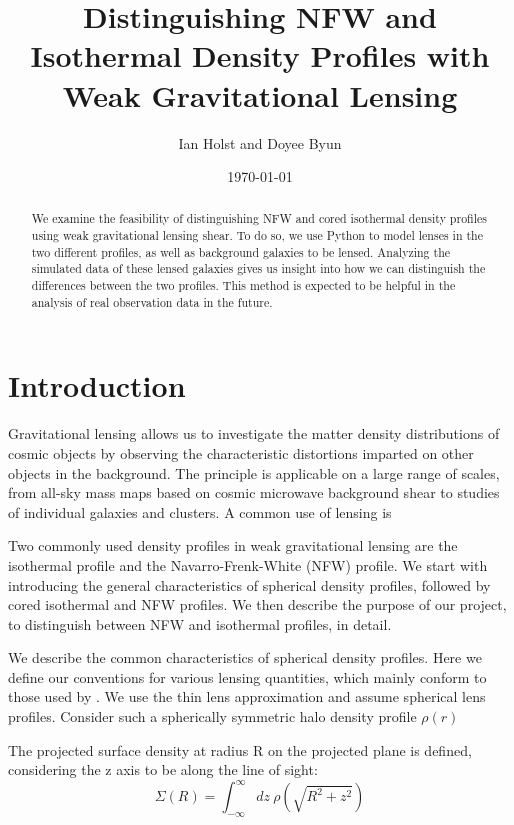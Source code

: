 \documentclass[10pt]{article}
\begin{document}
\title{Distinguishing NFW and Isothermal Density Profiles with Weak Gravitational Lensing}
\author{Ian Holst and Doyee Byun}
\date{\today}
\maketitle

\begin{abstract}
We examine the feasibility of distinguishing NFW and cored isothermal density profiles using weak gravitational lensing shear.
 To do so, we use Python to model lenses in the two different profiles, as well as background galaxies to be lensed.
 Analyzing the simulated data of these lensed galaxies gives us insight into how we can distinguish the differences between the two profiles.
 This method is expected to be helpful in the analysis of real observation data in the future.
\end{abstract}

\section{Introduction}
Gravitational lensing allows us to investigate the matter density distributions of cosmic objects by observing the characteristic distortions imparted on other objects in the background. The principle is applicable on a large range of scales, from all-sky mass maps based on cosmic microwave background shear to studies of individual galaxies and clusters.
A common use of lensing is

Two commonly used density profiles in weak gravitational lensing are the isothermal profile and the Navarro-Frenk-White (NFW) profile.
We start with introducing the general characteristics of spherical density profiles, followed by cored isothermal and NFW profiles.
We then describe the purpose of our project, to distinguish between NFW and isothermal profiles, in detail.


We describe the common characteristics of spherical density profiles.
Here we define our conventions for various lensing quantities, which mainly conform to those used by \citet{Dodelson2017}. We use the thin lens approximation and assume spherical lens profiles.
Consider such a spherically symmetric halo density profile $\rho(r)$

The projected surface density at radius R on the projected plane is defined, considering the z axis to be along the line of sight:
\begin{equation}
\Sigma(R) = \int_{-\infty}^{\infty}{dz\ \rho(\sqrt{R^2 + z^2})}
\end{equation}
\end{document}
